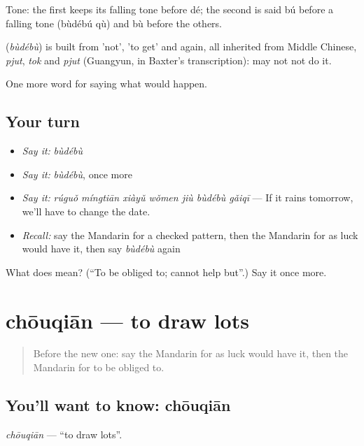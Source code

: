 Tone: the first  keeps its falling tone before dé; the second is said bú before a falling tone (bùdébú qù) and bù before the others.

\begin{cousinweb}
\textbf{} (\emph{bùdébù}) is built from  'not',  'to get' and  again, all inherited from Middle Chinese, \emph{pjut}, \emph{tok} and \emph{pjut} (Guangyun, in Baxter's transcription): may not not do it.
\end{cousinweb}

\begin{grammarlens}[title={What you've built}]
One more word for saying what would happen.
\end{grammarlens}

\subsection*{Your turn}
\begin{itemize}
\raggedright
  \item \emph{Say it:} \emph{bùdébù}
  \item \emph{Say it:} \emph{bùdébù}, once more
  \item \emph{Say it:} \emph{rúguǒ míngtiān xiàyǔ wǒmen jiù bùdébù gǎiqī} — If it rains tomorrow, we'll have to change the date.
  \item \emph{Recall:} say the Mandarin for a checked pattern, then the Mandarin for as luck would have it, then say \emph{bùdébù} again
\end{itemize}

\begin{tcolorbox}[breakable,colback=teal!4,colframe=teal!35!black,title={Before you move on}]
What does  mean? (\textquotedblleft{}To be obliged to; cannot help but\textquotedblright{}.) Say it once more.
\end{tcolorbox}
\section[chōuqiān]{chōuqiān — to draw lots}

\label{lesson:ZH-C528-chouqian}



\begin{quote}
Before the new one: say the Mandarin for as luck would have it, then the Mandarin for to be obliged to.
\end{quote}

\subsection*{You'll want to know: chōuqiān}
\emph{chōuqiān} — \textquotedblleft{}to draw lots\textquotedblright{}.


